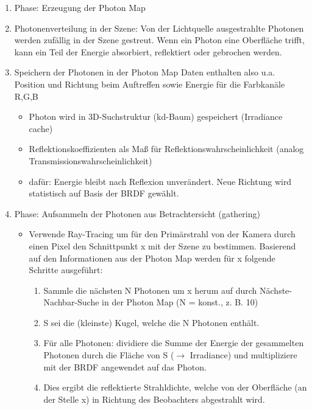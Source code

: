 \documentclass[10pt,landscape]{article}
\begin{document}
\begin{multicols}{3}
{  \begin{enumerate}
    \item Phase: Erzeugung der Photon Map
    \item Photonenverteilung in der Szene: Von der Lichtquelle ausgestrahlte Photonen werden zufällig in der Szene gestreut. Wenn ein Photon eine Oberfläche trifft, kann ein Teil der Energie absorbiert, reflektiert oder gebrochen werden.
    \item Speichern der Photonen in der Photon Map Daten enthalten also u.a. Position und Richtung beim Auftreffen sowie Energie für die Farbkanäle R,G,B
          \begin{itemize}
            \item Photon wird in 3D-Suchstruktur (kd-Baum) gespeichert (Irradiance cache)
            \item Reflektionskoeffizienten als Maß für Reflektionswahrscheinlichkeit (analog Transmissionswahrscheinlichkeit)
            \item dafür: Energie bleibt nach Reflexion unverändert. Neue Richtung wird statistisch auf Basis der BRDF gewählt.
          \end{itemize}
    \item  Phase: Aufsammeln der Photonen aus Betrachtersicht (gathering)
          \begin{itemize}
            \item Verwende Ray-Tracing um für den Primärstrahl von der Kamera durch einen Pixel den Schnittpunkt x mit der Szene zu bestimmen. Basierend auf den Informationen aus der Photon Map werden für x folgende Schritte ausgeführt:
                  \begin{enumerate}
                    \item Sammle die nächsten N Photonen um x herum auf durch Nächste-Nachbar-Suche in der Photon Map (N = konst., z. B. 10)
                    \item S sei die (kleinste) Kugel, welche die N Photonen enthält.
                    \item Für alle Photonen: dividiere die Summe der Energie der gesammelten Photonen durch die Fläche von S ($\rightarrow$ Irradiance) und multipliziere mit der  BRDF angewendet auf das Photon.
                    \item Dies ergibt die reflektierte Strahldichte, welche von der Oberfläche (an der Stelle x) in Richtung des Beobachters abgestrahlt wird.
                  \end{enumerate}
          \end{itemize}
  \end{enumerate}
  
}
\end{multicols}
\end{document}
